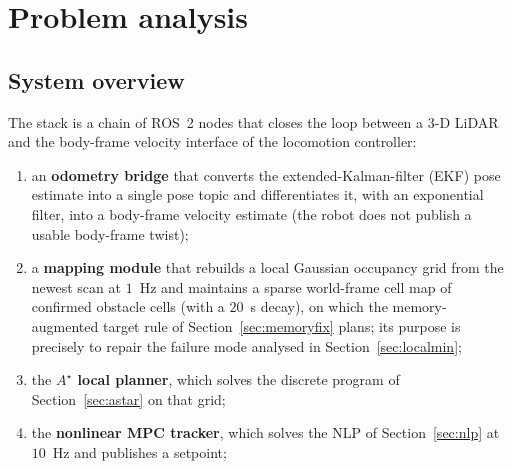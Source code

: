 \documentclass[11pt,a4paper]{article}
\newcommand{\astar}{$A^\star$}
\begin{document}

\section{Problem analysis}
\label{sec:problem}

\subsection{System overview}
\label{sec:overview}

The stack is a chain of ROS~2 nodes that closes the loop between a 3-D LiDAR and the
body-frame velocity interface of the locomotion controller:

\begin{enumerate}[label=\arabic*.]
  \item an \textbf{odometry bridge} that converts the extended-Kalman-filter (EKF) pose estimate into a
        single pose topic and differentiates it, with an exponential filter, into a body-frame velocity estimate (the robot does
        not publish a usable body-frame twist);
  \item a \textbf{mapping module} that rebuilds a local Gaussian occupancy grid from the newest scan at
        $1$~Hz and maintains a sparse world-frame cell map of confirmed obstacle cells (with a $20$~s
        decay), on which the memory-augmented target rule of Section~\ref{sec:memoryfix} plans; its purpose
        is precisely to repair the failure mode analysed in Section~\ref{sec:localmin};
  \item the \textbf{\astar{} local planner}, which solves the discrete program of
        Section~\ref{sec:astar} on that grid;
  \item the \textbf{nonlinear MPC tracker}, which solves the NLP of Section~\ref{sec:nlp} at $10$~Hz and
        publishes a setpoint;
\end{enumerate}
\end{document}
